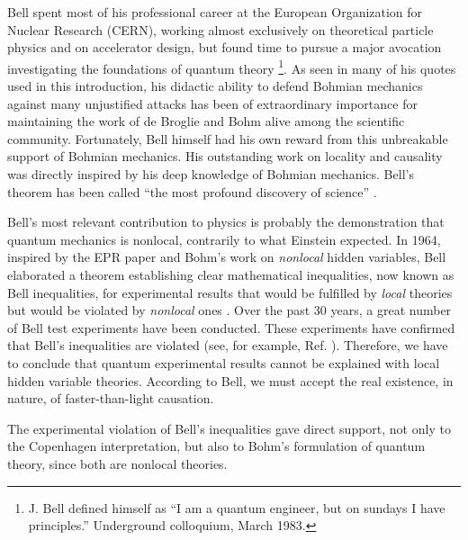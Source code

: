 \documentclass[nofootinbib, secnumarabic, amsmath, nobibnotes,11pt,aps,pra, floatfix]{revtex4-1}
\begin{document}
Bell spent most of his professional career at the European
Organization for Nuclear Research (CERN), working almost exclusively
on theoretical particle physics and on accelerator design, but found
time to pursue a major avocation investigating the foundations of
quantum theory \footnote{J. Bell defined himself as ``I am a quantum engineer, but on sundays I have principles.'' Underground colloquium, March 1983.}. As seen in many of his quotes used in this
introduction, his didactic ability to defend Bohmian mechanics
against many unjustified attacks has been of extraordinary
importance for maintaining the work of de Broglie and Bohm alive
among the scientific community. Fortunately, Bell himself had his
own reward from this unbreakable support of Bohmian mechanics. His
outstanding work on locality and causality was directly inspired by
his deep knowledge of Bohmian mechanics. Bell's theorem has been
called ``the most profound discovery of science''
\cite{om.stapp1977}.

Bell's most relevant contribution to physics is probably the
demonstration that quantum mechanics is nonlocal, contrarily to what
Einstein expected. In 1964, inspired by the EPR paper
\cite{om.Einstein_rosen1935} and Bohm's work on \textit{nonlocal}
hidden variables, Bell elaborated a theorem establishing clear
mathematical inequalities, now known as Bell inequalities, for
experimental results that would be fulfilled by \textit{local}
theories but would be violated by \textit{nonlocal} ones
\cite{om.Bell1964}. Over the past 30 years, a great number of Bell
test experiments have been conducted. These experiments have
confirmed that Bell's inequalities are violated (see, for example,
Ref. \cite{om.aspect1982}). Therefore, we have to conclude that
quantum experimental results cannot be explained with local hidden
variable theories. According to Bell, we must accept the real
existence, in nature, of faster-than-light causation.

The experimental violation of Bell's inequalities gave direct support, not only to the Copenhagen interpretation, but also to Bohm's formulation of quantum theory, since both are nonlocal theories.
\end{document}
